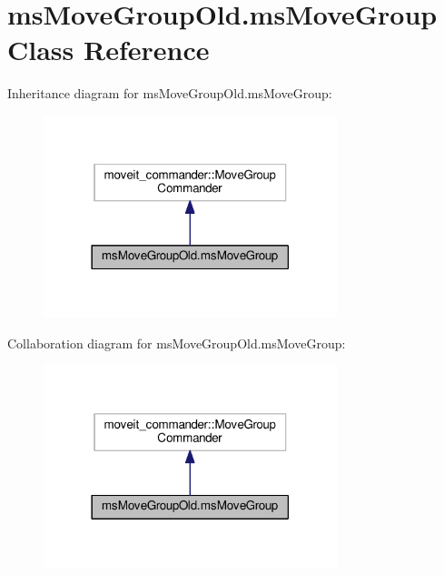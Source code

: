 \hypertarget{classmsMoveGroupOld_1_1msMoveGroup}{}\section{ms\+Move\+Group\+Old.\+ms\+Move\+Group Class Reference}
\label{classmsMoveGroupOld_1_1msMoveGroup}


Inheritance diagram for ms\+Move\+Group\+Old.\+ms\+Move\+Group\+:\nopagebreak
\begin{figure}[H]
\begin{center}
\leavevmode
\includegraphics[width=242pt]{classmsMoveGroupOld_1_1msMoveGroup__inherit__graph}
\end{center}
\end{figure}


Collaboration diagram for ms\+Move\+Group\+Old.\+ms\+Move\+Group\+:\nopagebreak
\begin{figure}[H]
\begin{center}
\leavevmode
\includegraphics[width=242pt]{classmsMoveGroupOld_1_1msMoveGroup__coll__graph}
\end{center}
\end{figure}
